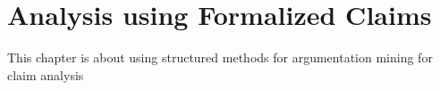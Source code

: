 \chapter{Analysis using Formalized Claims}
\label{chap:analysis}

This chapter is about using structured methods for argumentation mining
for claim analysis \\
